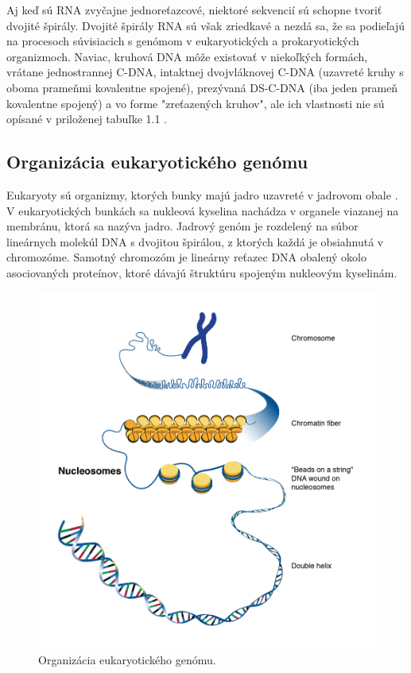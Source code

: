 Aj keď sú RNA zvyčajne jednoreťazcové, niektoré sekvencií sú schopne tvoriť dvojité špirály.
Dvojité špirály RNA sú však zriedkavé a nezdá sa, že sa podieľajú na procesoch súvisiacich s genómom v eukaryotických a prokaryotických organizmoch.
Naviac, kruhová DNA môže existovať v niekoľkých formách, vrátane jednostrannej C-DNA, intaktnej dvojvláknovej C-DNA (uzavreté kruhy s oboma prameňmi kovalentne spojené),
prezývaná DS-C-DNA (iba jeden prameň kovalentne spojený) a vo forme "zreťazených kruhov", ale ich vlastnosti nie sú opísané v priloženej tabuľke 1.1 .

\subsection{Organizácia eukaryotického genómu}
Eukaryoty sú organizmy, ktorých bunky majú jadro uzavreté v jadrovom obale \cite{BioDict}.
V eukaryotických bunkách sa nukleová kyselina nachádza v organele viazanej na membránu, ktorá sa nazýva jadro.
Jadrový genóm je rozdelený na súbor lineárnych molekúl DNA s dvojitou špirálou, z ktorých každá je obsiahnutá v chromozóme.
Samotný chromozóm je lineárny reťazec DNA obalený okolo asociovaných proteínov, ktoré dávajú štruktúru spojeným nukleovým kyselinám.

\begin{figure}[!ht]
	\centering
	\includegraphics[width=.8\textwidth]{figures/nucleosome1}
	\caption{Organizácia eukaryotického genómu.\label{o:latex_friendly_zone}}
\end{figure}

